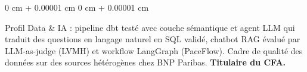 \documentclass[10pt, letterpaper]{article}
\newenvironment{onecolentry}{
    \begin{adjustwidth}{
        0 cm + 0.00001 cm
    }{
        0 cm + 0.00001 cm
    }
}{
    \end{adjustwidth}
} %
\begin{document}
\begin{onecolentry}
Profil Data \& IA : pipeline dbt testé avec couche sémantique et agent LLM qui traduit des questions en langage naturel en SQL validé, chatbot RAG évalué par LLM-as-judge (LVMH) et workflow LangGraph (PaceFlow). Cadre de qualité des données sur des sources hétérogènes chez BNP Paribas. \textbf{Titulaire du CFA.}
        \end{onecolentry}

        \vspace{0.2 cm}
\end{document}
